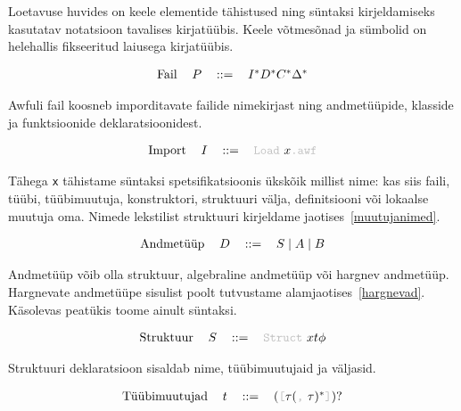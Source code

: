 \documentclass[12pt]{article}
\begin{document}
    Loetavuse huvides on keele elementide tähistused ning süntaksi kirjeldamiseks kasutatav notatsioon tavalises kirjatüübis. Keele võtmesõnad ja sümbolid on helehallis fikseeritud laiusega kirjatüübis.

    \begin{equation*}
      \begin{tabular}{llll}
        Fail & $P$ & $::=$ & $I^*D^*C^*\Delta^*$
      \end{tabular}
    \end{equation*}

    Awfuli fail koosneb imporditavate failide nimekirjast ning andmetüüpide, klasside ja funktsioonide deklaratsioonidest.

    \begin{equation*}
      \begin{tabular}{llll}
        Import & $I$ & $::=$ & {\color{helehall}\verb!Load!} $x${\color{helehall}\verb!.awf!}
      \end{tabular}
    \end{equation*}

    Tähega \verb!x! tähistame süntaksi spetsifikatsioonis ükskõik millist nime: kas siis faili, tüübi, tüübimuutuja, konstruktori, struktuuri välja, definitsiooni või lokaalse muutuja oma. Nimede lekstilist struktuuri kirjeldame jaotises~\ref{muutujanimed}.

    \begin{equation*}
      \begin{tabular}{llll}
        Andmetüüp & $D$ & $::=$ & $S\mid A\mid B$
      \end{tabular}
    \end{equation*}

    Andmetüüp võib olla struktuur, algebraline andmetüüp või hargnev andmetüüp. Hargnevate andmetüüpe sisulist poolt tutvustame alamjaotises~\ref{hargnevad}. Käsolevas peatükis toome ainult süntaksi.

    \begin{equation*}
      \begin{tabular}{llll}
        Struktuur & $S$ & $::=$ & {\color{helehall}\verb!Struct!} $xt\phi$
      \end{tabular}
    \end{equation*}

    Struktuuri deklaratsioon sisaldab nime, tüübimuutujaid ja väljasid.

    \begin{equation*}
      \begin{tabular}{llll}
        Tüübimuutujad & $t$ & $::=$ & $(${\color{helehall}\verb![!}$\tau(${\color{helehall}\verb!,!} $\tau)^*${\color{helehall}\verb!]!}$)?$
      \end{tabular}
    \end{equation*}
\end{document}
